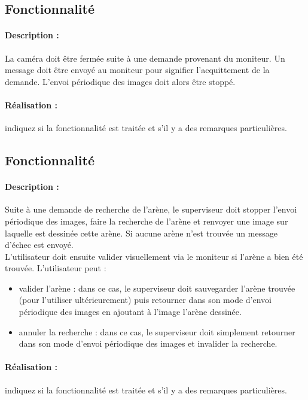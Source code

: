 \documentclass[11pt, a4paper]{paper}
\newcounter{cptreq}
\begin{document}
\subsection{Fonctionnalité \thecptreq}

\paragraph{Description :} La caméra doit être fermée suite à une demande provenant du moniteur. Un message doit être envoyé au moniteur pour signifier l'acquittement de la demande. L'envoi périodique des images doit alors être stoppé.

\paragraph{\color{black}Réalisation :}  {\color{red} indiquez si la fonctionnalité est traitée et s'il y a des remarques particulières.}
\subsection{Fonctionnalité \thecptreq}

\paragraph{Description :} Suite à une demande de recherche de l'arène, le superviseur doit stopper l'envoi périodique des images, faire la recherche de l'arène et renvoyer une image sur laquelle est dessinée cette arène. Si aucune arène n'est trouvée un message d'échec est envoyé.\\

L'utilisateur doit ensuite valider visuellement via le moniteur si l'arène a bien été trouvée. L'utilisateur peut :
\begin{itemize}
	\item valider l'arène : dans ce cas, le superviseur doit sauvegarder l'arène trouvée (pour l'utiliser ultérieurement) puis retourner dans son mode d'envoi périodique des images en ajoutant à l'image l'arène dessinée.
 	\item annuler la recherche : dans ce cas, le superviseur doit simplement retourner dans son mode d'envoi périodique des images et invalider la recherche.
\end{itemize}

\paragraph{\color{black}Réalisation :}  {\color{red} indiquez si la fonctionnalité est traitée et s'il y a des remarques particulières.}
\end{document}
